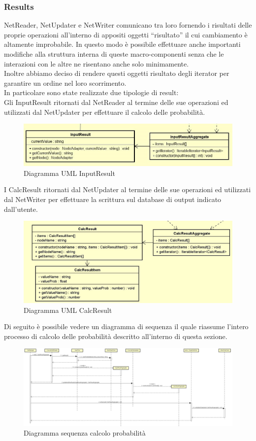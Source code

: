 \subsubsection{Results}
NetReader, NetUpdater e NetWriter comunicano tra loro fornendo i risultati delle proprie operazioni  all'interno di appositi oggetti “risultato” il cui cambiamento è altamente improbabile. In questo modo è possibile effettuare anche importanti modifiche alla struttura interna di queste macro-componenti senza che le interazioni con le altre ne risentano anche solo minimamente.\\
Inoltre abbiamo deciso di rendere questi oggetti risultato degli iterator per garantire un ordine nel loro scorrimento.\\
In particolare sono state realizzate due tipologie di result:\\
Gli InputResult ritornati dal NetReader al termine delle sue operazioni ed utilizzati dal NetUpdater per effettuare il calcolo delle probabilità.
\begin{figure} [H]
	\centering
	\includegraphics[scale=0.65]{Img/InputResult}
	\caption{Diagramma UML InputResult}\label{}
\end{figure}
I CalcResult ritornati dal NetUpdater al termine delle sue operazioni ed utilizzati dal NetWriter per effettuare la scrittura sul database di output indicato dall'utente.
\begin{figure} [H]
	\centering
	\includegraphics[scale=0.5]{Img/CalcResult}
	\caption{Diagramma UML CalcResult}\label{}
\end{figure}
Di seguito è possibile vedere un diagramma di sequenza il quale riassume l'intero processo di calcolo delle probabilità descritto all'interno di questa sezione.
\begin{figure} [H]
	\centering
			\includegraphics[scale=0.17]{Img/ProcessoRicalcolo}
	\caption{Diagramma sequenza calcolo probabilità}\label{}
\end{figure}
